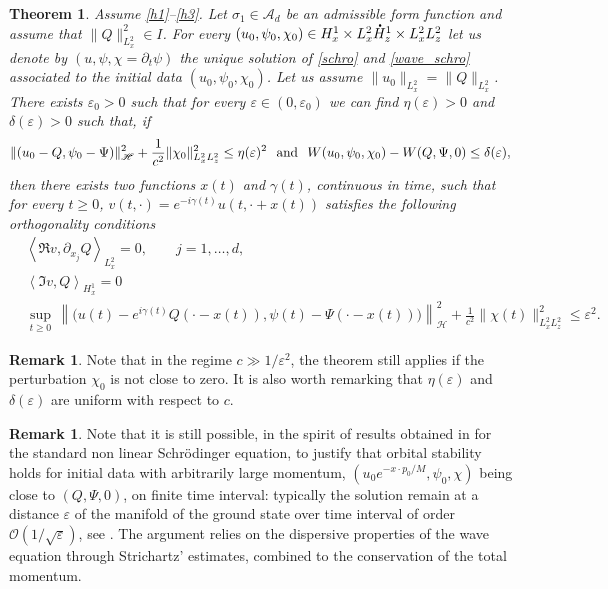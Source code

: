 \documentclass[10pt]{amsart}
\let\epsilon\varepsilon
\newtheorem{theo}[lemma]{Theorem}
\theoremstyle{definition}
\newtheorem{rmk}[lemma]{Remark}
\newcommand*{\overbigdot}[1]{%
\accentset{\mbox{\large\bfseries .}}{#1}}
\begin{document}
\begin{theo}\label{orbital_stab_2}
Assume \eqref{h1}--\eqref{h3}. Let $\sigma_{1}\in\mathscr{A}_{d}$ be an admissible form function and assume that $\|Q\|_{L_{x}^{2}}^{2}\in I$.
For every $(u_{0},\psi_{0},\chi_{0})\in H_{x}^{1}\times L_{x}^{2}\overbigdot{H}_{z}^{1}\times L_{x}^{2}L_{z}^{2}$ let us denote by $(u,\psi,\chi=\partial_t\psi)$ the unique solution of \eqref{schro} and \eqref{wave_schro} associated to the initial data $(u_{0},\psi_{0},\chi_{0})$. Let us assume $\|u_{0}\|_{L_{x}^{2}}=\|Q\|_{L_{x}^{2}}$. There exists $\varepsilon_{0}>0$ such that for every $\varepsilon\in(0,\varepsilon_{0})$ we can find $\eta(\varepsilon)>0$ and $\delta(\varepsilon)>0$ such that, if
\[
\|(u_{0}-Q,\psi_{0}-\Psi)\|_{\mathscr {H}}^{2}+\frac{1}{c^{2}}\|\chi_{0}\|_{L_{x}^{2}L_{z}^{2}}^{2}\leq\eta(\varepsilon)^{2} \hspace{0.25cm}\text{and}\hspace{0.25cm} W(u_{0},\psi_{0},\chi_{0})-W(Q,\Psi,0)\leq\delta(\varepsilon),
\]
then there exists two functions $x(t)$ and $\gamma(t)$, continuous in time, such that for every $t\geq 0$, $v(t,\cdot)=e^{-i\gamma(t)}u(t,\cdot+x(t))$ satisfies the following orthogonality conditions\vspace*{-3pt}
\begin{subequations}
\begin{align}
\label{ortho1}
&\left\langle\Re  v,\partial_{x_{j}}Q\right\rangle_{L_{x}^{2}}=0, \qquad j=1,\ldots,d,\\
\label{ortho2}
&\left\langle\Im  v,Q\right\rangle_{H_{x}^{1}}=0\\
\tag*{and}
&\underset{t\geq 0}{\sup}\,\left\|
\big(u(t)-e^{i\gamma(t)}Q(\cdot-x(t)),\psi(t)-\Psi(\cdot-x(t))\big)\right\|_{\mathscr {H}}^{2}+\frac{1}{c^{2}}\|\chi(t)\|_{L_{x}^{2}L_{z}^{2}}^{2}\leq\varepsilon^{2}.
\end{align}
\end{subequations}
\end{theo}


\begin{rmk}
Note that in the regime $c\gg 1/\varepsilon^{2}$, the theorem still applies if the perturbation $\chi_{0}$ is not close to zero.
It is also worth remarking that $\eta(\varepsilon)$ and $\delta(\varepsilon)$ are uniform with respect to $c$.
\end{rmk}

\begin{rmk} Note that it is still possible, in the spirit of results obtained in \cite{Faou} for the standard non linear Schrödinger equation, to justify that orbital stability holds for initial data with arbitrarily large momentum, $(u_0e^{-x\cdot p_0/M},\psi_0,\chi)$ being close to $(Q,\Psi,0)$, on finite time interval:
typically the solution remain at a distance $\epsilon$ of the manifold of the
ground state over time interval of order $\mathscr O(1/\sqrt\epsilon)$, see
\cite[Th.\,4.2.11 \& \S4.6]{LV_PhD}.
The argument relies on the dispersive properties
of the wave equation through Strichartz' estimates, combined to the conservation of the total momentum.
\end{rmk}
\end{document}
